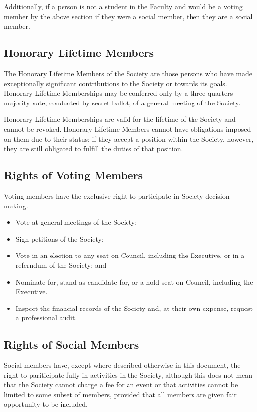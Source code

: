 Additionally, if a person is not a student in the Faculty and would be a voting
member by the above section if they were a social member, then they are a social
member.

\subsection{Honorary Lifetime Members}
The Honorary Lifetime Members of the Society are those persons who have made
exceptionally significant contributions to the Society or towards its goals.
Honorary Lifetime Memberships may be conferred only by a three-quarters majority
vote, conducted by secret ballot, of a general meeting of the Society.

Honorary Lifetime Memberships are valid for the lifetime of the Society and
cannot be revoked. Honorary Lifetime Members cannot have obligations imposed on
them due to their status; if they accept a position within the Society, however,
they are still obligated to fulfill the duties of that position.

\subsection{Rights of Voting Members}
Voting members have the exclusive right to participate in Society
decision-making:
\begin{itemize}
  \item Vote at general meetings of the Society;
  \item Sign petitions of the Society;
  \item Vote in an election to any seat on Council, including the Executive, or
    in a referndum of the Society; and
  \item Nominate for, stand as candidate for, or a hold seat on Council,
    including the Executive.
  \item Inspect the financial records of the Society and, at their own expense,
    request a professional audit.
\end{itemize}

\subsection{Rights of Social Members}
Social members have, except where described otherwise in this document, the
right to pariticipate fully in activities in the Society, although this does not
mean that the Society cannot charge a fee for an event or that activities cannot
be limited to some subset of members, provided that all members are given fair
opportunity to be included.

